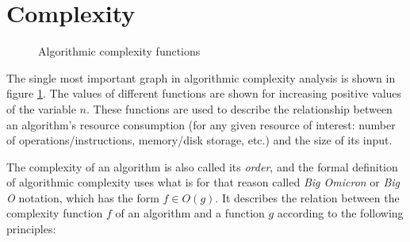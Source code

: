 \section{Complexity}

\label{sec:algo:comp}

\begin{figure}[p]
    \centering
    
    \caption{Algorithmic complexity functions}
    \label{fig:algo:comp}
\end{figure}

The single most important graph in algorithmic complexity analysis is shown in
figure \ref{fig:algo:comp}.  The values of different functions are shown for
increasing positive values of the variable $n$.  These functions are used to
describe the relationship between an algorithm's resource consumption (for any
given resource of interest: number of operations/instructions, memory/disk
storage, etc.) and the size of its input.

The complexity of an algorithm is also called its \textit{order}, and the formal
definition of algorithmic complexity uses what is for that reason called
\textit{Big Omicron} or \textit{Big O} notation\footnotemark, which has the form
$f \in O(g)$.  It describes the relation between the complexity function $f$ of
an algorithm and a function $g$ according to the following principles:


